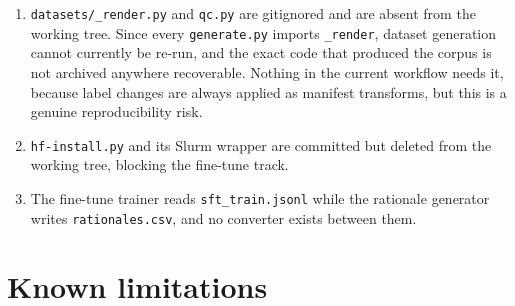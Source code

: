 \documentclass[11pt,a4paper]{article}
\newcommand{\file}[1]{{\small\texttt{#1}}}
\begin{document}
\begin{enumerate}
\item \file{datasets/\_render.py} and \file{qc.py} are gitignored and are absent
      from the working tree. Since every \file{generate.py} imports
      \texttt{\_render}, dataset generation cannot currently be re-run, and the
      exact code that produced the corpus is not archived anywhere recoverable.
      Nothing in the current workflow needs it, because label changes are always
      applied as manifest transforms, but this is a genuine reproducibility risk.
\item \file{hf-install.py} and its Slurm wrapper are committed but deleted from
      the working tree, blocking the fine-tune track.
\item The fine-tune trainer reads \file{sft\_train.jsonl} while the rationale
      generator writes \file{rationales.csv}, and no converter exists between
      them.
\end{enumerate}

\section{Known limitations}
\label{sec:limits}
\end{document}
